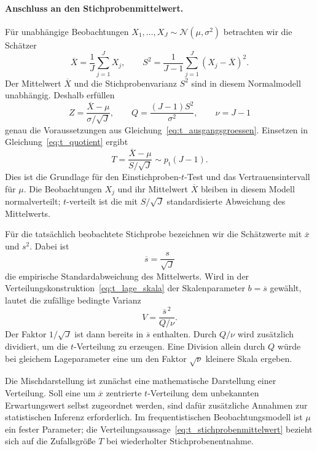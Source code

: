 \paragraph{Anschluss an den Stichprobenmittelwert.}
Für unabhängige Beobachtungen
$X_1,\ldots,X_J\sim\mathcal N(\mu,\sigma^2)$ betrachten wir die
Schätzer
\begin{equation}
  \overline X=\frac{1}{J}\sum_{j=1}^J X_j,
  \qquad
  S^2=\frac{1}{J-1}\sum_{j=1}^J(X_j-\overline X)^2.
\end{equation}
Der Mittelwert $\overline X$ und die Stichprobenvarianz $S^2$ sind
in diesem Normalmodell unabhängig. Deshalb erfüllen
\begin{equation}
  Z=\frac{\overline X-\mu}{\sigma/\sqrt J},
  \qquad
  Q=\frac{(J-1)S^2}{\sigma^2},
  \qquad \nu=J-1
\end{equation}
genau die Voraussetzungen aus Gleichung~\eqref{eq:t_ausgangsgroessen}.
Einsetzen in Gleichung~\eqref{eq:t_quotient} ergibt
\begin{equation}
  T=\frac{\overline X-\mu}{S/\sqrt J}
    \sim p_\mathrm{t}(J-1).
  \label{eq:t_stichprobenmittelwert}
\end{equation}
Dies ist die Grundlage für den Einstichproben-$t$-Test und das
Vertrauensintervall für $\mu$. Die Beobachtungen $X_j$ und ihr Mittelwert
$\overline X$ bleiben in diesem Modell normalverteilt; $t$-verteilt
ist die mit $S/\sqrt J$ standardisierte Abweichung des Mittelwerts.

Für die tatsächlich beobachtete Stichprobe bezeichnen wir die
Schätzwerte mit $\overline x$ und $s^2$. Dabei ist
\begin{equation}
  \overline s=\frac{s}{\sqrt J}
  \label{eq:t_empirische_standardabweichung_mittelwert}
\end{equation}
die empirische Standardabweichung des Mittelwerts.
Wird in der Verteilungskonstruktion~\eqref{eq:t_lage_skala}
der Skalenparameter $b=\overline s$ gewählt, lautet die zufällige
bedingte Varianz
\begin{equation}
  V=\frac{\overline s^{\,2}}{Q/\nu}.
\end{equation}
Der Faktor $1/\sqrt J$ ist dann bereits in $\overline s$ enthalten.
Durch $Q/\nu$ wird zusätzlich dividiert, um die $t$-Verteilung zu
erzeugen. Eine Division allein durch $Q$ würde bei gleichem
Lageparameter eine um den Faktor $\sqrt\nu$ kleinere Skala ergeben.

Die Mischdarstellung ist zunächst eine mathematische Darstellung
einer Verteilung. Soll eine um $\overline x$ zentrierte $t$-Verteilung
dem unbekannten Erwartungswert selbst zugeordnet werden, sind dafür
zusätzliche Annahmen zur statistischen Inferenz erforderlich. Im
frequentistischen Beobachtungsmodell ist $\mu$ ein fester Parameter;
die Verteilungsaussage~\eqref{eq:t_stichprobenmittelwert} bezieht
sich auf die Zufallsgröße $T$ bei wiederholter Stichprobenentnahme.

